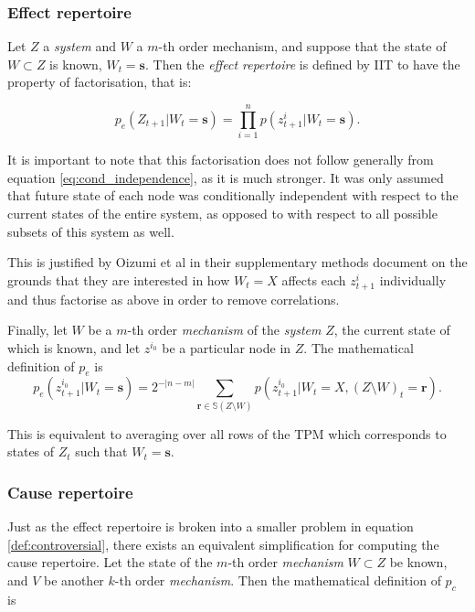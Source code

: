 \subsubsection{Effect repertoire}

Let $Z$ a \textit{system} and $W$ a $m$-th order mechanism, and suppose that the state of $W \subset Z$ is known, $W_t = \mathbf{s}$. Then the  \textit{effect repertoire} is defined by IIT \cite{oizumi2014phenomenology} to have the property of factorisation, that is:

\begin{equation}
\label{def:controversial}
p_e(Z_{t+1}|W_t = \mathbf{s}) = \prod \limits_{i= 1}^n p(z^i_{t+1}|W_t = \mathbf{s}).
\end{equation}

It is important to note that this factorisation does not follow generally from equation \ref{eq:cond_independence}, as it is much stronger. It was only assumed that future state of each node was conditionally independent with respect to the current states of the entire system, as opposed to with respect to all possible subsets of this system as well.

This is justified by Oizumi et al \cite{oizumi2014phenomenology} in their supplementary methods document on the grounds that they are interested in how $W_t=X$ affects each $z^i_{t+1}$ individually and thus factorise as above in order to remove correlations.


Finally, let $W$ be a $m$-th order \textit{mechanism} of the \textit{system} $Z$, the current state of which is known, and let $z^{i_0}$ be a particular node in $Z$. The mathematical definition \cite{krohn2016computing} of $p_e$ is
\begin{equation}
\label{def:effect_repertoire}
p_e(z_{t+1}^{i_0}|W_t = \mathbf{s}) = 2^{-|n-m|}\sum \limits_{\mathbf{r} \in \mathbb{S}(Z\setminus W)} p(z_{t+1}^{i_0}|W_t = X, (Z\setminus W)_t = \mathbf{r}).
\end{equation}

This is equivalent to averaging over all rows of the TPM which corresponds to states of $Z_t$ such that $ W_t = \mathbf{s} $.


\subsubsection{Cause repertoire}

Just as the effect repertoire is broken into a smaller problem in equation \ref{def:controversial}, there exists an equivalent simplification for computing the cause repertoire. Let the state of the $m$-th order \textit{mechanism} $W \subset Z$ be known, and $V$ be another $k$-th order \textit{mechanism}. Then the mathematical definition \cite{krohn2016computing} of $p_c$ is

